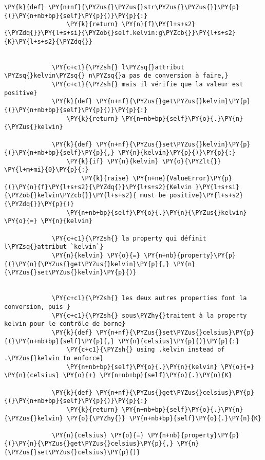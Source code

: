 \begin{Verbatim}[commandchars=\\\{\},frame=single,framerule=0.3mm,rulecolor=\color{cellframecolor}]
             \PY{k}{def} \PY{n+nf}{\PYZus{}\PYZus{}str\PYZus{}\PYZus{}}\PY{p}{(}\PY{n+nb+bp}{self}\PY{p}{)}\PY{p}{:}
                 \PY{k}{return} \PY{n}{f}\PY{l+s+s2}{\PYZdq{}}\PY{l+s+si}{\PYZob{}self.kelvin:g\PYZcb{}}\PY{l+s+s2}{K}\PY{l+s+s2}{\PYZdq{}}
         
         
             \PY{c+c1}{\PYZsh{} l\PYZsq{}attribut \PYZsq{}kelvin\PYZsq{} n\PYZsq{}a pas de conversion à faire,}
             \PY{c+c1}{\PYZsh{} mais il vérifie que la valeur est positive}
             \PY{k}{def} \PY{n+nf}{\PYZus{}get\PYZus{}kelvin}\PY{p}{(}\PY{n+nb+bp}{self}\PY{p}{)}\PY{p}{:}
                 \PY{k}{return} \PY{n+nb+bp}{self}\PY{o}{.}\PY{n}{\PYZus{}kelvin}
         
             \PY{k}{def} \PY{n+nf}{\PYZus{}set\PYZus{}kelvin}\PY{p}{(}\PY{n+nb+bp}{self}\PY{p}{,} \PY{n}{kelvin}\PY{p}{)}\PY{p}{:}
                 \PY{k}{if} \PY{n}{kelvin} \PY{o}{\PYZlt{}} \PY{l+m+mi}{0}\PY{p}{:}
                     \PY{k}{raise} \PY{n+ne}{ValueError}\PY{p}{(}\PY{n}{f}\PY{l+s+s2}{\PYZdq{}}\PY{l+s+s2}{Kelvin }\PY{l+s+si}{\PYZob{}kelvin\PYZcb{}}\PY{l+s+s2}{ must be positive}\PY{l+s+s2}{\PYZdq{}}\PY{p}{)}
                 \PY{n+nb+bp}{self}\PY{o}{.}\PY{n}{\PYZus{}kelvin} \PY{o}{=} \PY{n}{kelvin}
         
             \PY{c+c1}{\PYZsh{} la property qui définit l\PYZsq{}attribut `kelvin`}
             \PY{n}{kelvin} \PY{o}{=} \PY{n+nb}{property}\PY{p}{(}\PY{n}{\PYZus{}get\PYZus{}kelvin}\PY{p}{,} \PY{n}{\PYZus{}set\PYZus{}kelvin}\PY{p}{)}
         
         
             \PY{c+c1}{\PYZsh{} les deux autres properties font la conversion, puis }
             \PY{c+c1}{\PYZsh{} sous\PYZhy{}traitent à la property kelvin pour le contrôle de borne}
             \PY{k}{def} \PY{n+nf}{\PYZus{}set\PYZus{}celsius}\PY{p}{(}\PY{n+nb+bp}{self}\PY{p}{,} \PY{n}{celsius}\PY{p}{)}\PY{p}{:}
                 \PY{c+c1}{\PYZsh{} using .kelvin instead of .\PYZus{}kelvin to enforce}
                 \PY{n+nb+bp}{self}\PY{o}{.}\PY{n}{kelvin} \PY{o}{=} \PY{n}{celsius} \PY{o}{+} \PY{n+nb+bp}{self}\PY{o}{.}\PY{n}{K}
         
             \PY{k}{def} \PY{n+nf}{\PYZus{}get\PYZus{}celsius}\PY{p}{(}\PY{n+nb+bp}{self}\PY{p}{)}\PY{p}{:}
                 \PY{k}{return} \PY{n+nb+bp}{self}\PY{o}{.}\PY{n}{\PYZus{}kelvin} \PY{o}{\PYZhy{}} \PY{n+nb+bp}{self}\PY{o}{.}\PY{n}{K}
             
             \PY{n}{celsius} \PY{o}{=} \PY{n+nb}{property}\PY{p}{(}\PY{n}{\PYZus{}get\PYZus{}celsius}\PY{p}{,} \PY{n}{\PYZus{}set\PYZus{}celsius}\PY{p}{)}
         

\end{Verbatim}
